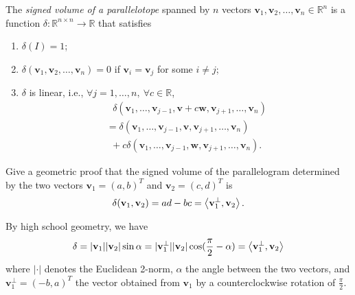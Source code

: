 \begin{defn}
  \label{def:signedVolume}
  The \emph{signed volume of a parallelotope}
  spanned by $n$ vectors
  $\mathbf{v}_1, \mathbf{v}_{2},\ldots, \mathbf{v}_n\in \mathbb{R}^n$
  is a function $\delta: \mathbb{R}^{n\times n} \rightarrow \mathbb{R}$
  that satisfies
  \begin{enumerate}[(SVP-1)]
  \item $\delta(I) = 1$;
  \item $\delta(\mathbf{v}_1, \mathbf{v}_2, \ldots, \mathbf{v}_n)=0$
    if $\mathbf{v}_i=\mathbf{v}_j$ for some $i\ne j$;
  \item $\delta$ is linear, i.e.,
    $\forall j=1,\ldots,n,\ \forall c\in \mathbb{R}$,
    \begin{equation}
      \label{eq:linearityOfSignedVolumn}
      \begin{array}{l}
        \ \ \ \delta(\mathbf{v}_1, \ldots,
          \mathbf{v}_{j-1}, \mathbf{v}+ c\mathbf{w}, \mathbf{v}_{j+1},
          \ldots, \mathbf{v}_n)
        \\
        = \delta(\mathbf{v}_1, \ldots,
            \mathbf{v}_{j-1}, \mathbf{v}, \mathbf{v}_{j+1},
            \ldots, \mathbf{v}_n)
        \\
        \ \ + 
      c\delta(\mathbf{v}_1, \ldots,
      \mathbf{v}_{j-1}, \mathbf{w}, \mathbf{v}_{j+1},
      \ldots, \mathbf{v}_n).
      \end{array}
    \end{equation}
  \end{enumerate}
\end{defn}

\begin{exc}
  Give a geometric proof that
  the signed volume of the parallelogram
  determined by the two vectors $\mathbf{v}_1=(a,b)^T$
  and  $\mathbf{v}_2=(c,d)^T$
  is 
   \begin{equation}
     \label{eq:determinantN2}
    \delta(\mathbf{v}_1, \mathbf{v}_2)
    = ad-bc = \left\langle \mathbf{v}^{\perp}_1, \mathbf{v}_2 \right\rangle.
  \end{equation}
\end{exc}
\begin{solution}
  By high school geometry, we have
  \begin{displaymath}
    \delta = |\mathbf{v}_1||\mathbf{v}_2|\sin \alpha
    = |\mathbf{v}^{\perp}_1||\mathbf{v}_2|\cos(\frac{\pi}{2}-\alpha)
    = \left\langle \mathbf{v}^{\perp}_1, \mathbf{v}_2 \right\rangle
  \end{displaymath}
  where $|\cdot|$ denotes the Euclidean 2-norm, 
  $\alpha$ the angle between the two vectors, 
  and $\mathbf{v}^{\perp}_1=(-b,a)^T$ the vector obtained from $\mathbf{v}_1$
  by a counterclockwise rotation of $\frac{\pi}{2}$.
\end{solution}

